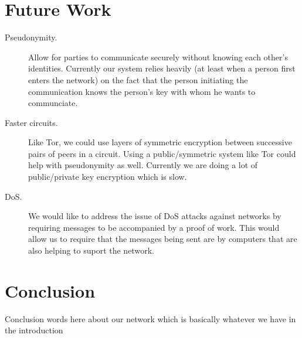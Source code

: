 \documentclass[twocolumn,11pt,english]{paper}
\begin{document}
\section{Future Work}
\begin{description}
\item[Pseudonymity.] Allow for parties to communicate securely without knowing each other's identities. Currently our system relies heavily (at least when a person first enters the network) on the fact that the person initiating the communication knows the person's key with whom he wants to communciate.

\item[Faster circuits.] Like Tor, we could use layers of symmetric encryption between successive pairs of peers in a circuit. Using a public/symmetric system like Tor could help with pseudonymity as well. Currently we are doing a lot of public/private key encryption which is slow.

\item[DoS.] We would like to address the issue of DoS attacks against networks by requiring messages to be accompanied by a proof of work. This would allow us to require that the messages being sent are by computers that are also helping to suport the network.
\end{description}

\section{Conclusion}
Conclusion words here about our network which is basically whatever we have in the introduction

\newpage



\end{document}
